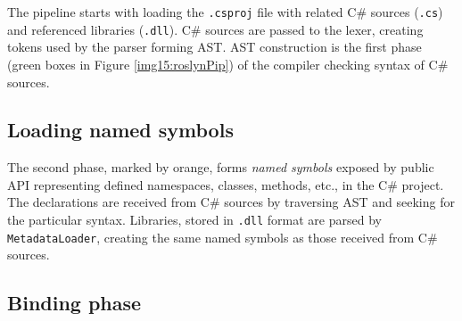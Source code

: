The pipeline starts with loading the \texttt{.csproj} file with related C\# sources (\texttt{.cs}) and referenced libraries (\texttt{.dll}).
C\# sources are passed to the lexer, creating tokens used by the parser forming \ac{AST}.
\ac{AST} construction is the first phase (green boxes in Figure \ref{img15:roslynPip}) of the compiler checking syntax of C\# sources.

\subsection{Loading named symbols}

The second phase, marked by orange, forms \emph{named symbols} exposed by public API representing defined namespaces, classes, methods, etc., in the C\# project. 
The declarations are received from C\# sources by traversing \ac{AST} and seeking for the particular syntax. 
Libraries, stored in \texttt{.dll} format are parsed by \texttt{MetadataLoader}, creating the same named symbols as those received from C\# sources.

\subsection{Binding phase}

